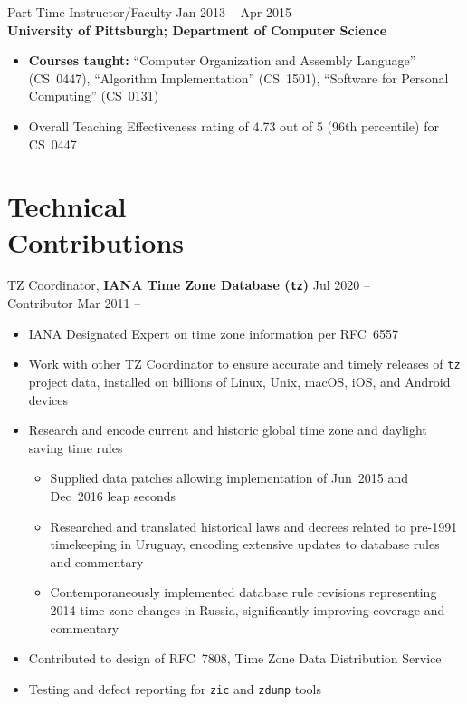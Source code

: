 \documentclass[11pt]{article}
\newcommand{\textdb}[1]{\fontseries{db}\selectfont#1\normalfont}
\newcommand{\present}{\phantom{Xxx 20XX}}
\begin{document}
\textdb{
Part-Time Instructor/Faculty
	\hfill Jan 2013 -- Apr 2015 \\
}
\textbf{University of Pittsburgh; Department of Computer Science}
\begin{itemize}
	\item \textbf{Courses taught:}
		``Computer Organization and Assembly Language'' (CS~0447),
		``Algorithm Implementation'' (CS~1501),
		``Software for Personal Computing'' (CS~0131)
	\item Overall Teaching Effectiveness rating of 4.73 out of 5
		(96th percentile) for CS~0447
\end{itemize}



\section{Technical\\ Contributions}

\textdb{
TZ Coordinator,
\textbf{IANA Time Zone Database (\texttt{tz})}
	\hfill Jul 2020 -- \present \\
}
\textdb{
Contributor
	\hfill Mar 2011 -- \present
}
\begin{itemize}
	\item IANA Designated Expert on time zone information per RFC~6557
	\item Work with other TZ Coordinator to ensure accurate and timely releases
		of \texttt{tz} project data,
		installed on billions of Linux, Unix, macOS, iOS, and Android devices
	\item Research and encode current and historic global time zone and daylight saving time rules
		\begin{itemize}
			\item Supplied data patches allowing implementation of
				Jun~2015 and Dec~2016 leap seconds
			\item Researched and translated historical laws and decrees
				related to pre-1991 timekeeping in Uruguay,
				encoding extensive updates to database rules and commentary
			\item Contemporaneously implemented database rule revisions
				representing 2014 time zone changes in Russia,
				significantly improving coverage and commentary
		\end{itemize}
	\item Contributed to design of RFC~7808, Time Zone Data Distribution Service
	\item Testing and defect reporting for \texttt{zic} and \texttt{zdump} tools
\end{itemize}
\end{document}
